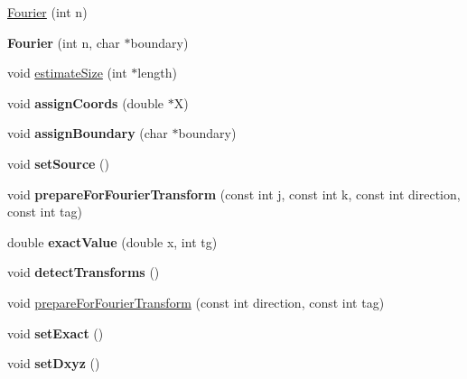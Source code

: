 \begin{DoxyCompactItemize}
\item 
\hyperlink{classFourier_a56003ca961eb3bd1caec48eb320903a7}{Fourier} (int n)
\item 
\hypertarget{classFourier_aeb302d1f719a360cf1a08a03511babcf}{{\bfseries Fourier} (int n, char $\ast$boundary)}\label{classFourier_aeb302d1f719a360cf1a08a03511babcf}

\item 
void \hyperlink{classFourier_a9dc1752ffd8a1f99c109f003308d6f8a}{estimate\-Size} (int $\ast$length)
\item 
\hypertarget{classFourier_a67b96468ace0838f1fe082e894785657}{void {\bfseries assign\-Coords} (double $\ast$X)}\label{classFourier_a67b96468ace0838f1fe082e894785657}

\item 
\hypertarget{classFourier_a844a3e6ffe6027a988cd232de72cf62d}{void {\bfseries assign\-Boundary} (char $\ast$boundary)}\label{classFourier_a844a3e6ffe6027a988cd232de72cf62d}

\item 
\hypertarget{classFourier_a1f74b27c03f745a385f7f6bd1f7a472a}{void {\bfseries set\-Source} ()}\label{classFourier_a1f74b27c03f745a385f7f6bd1f7a472a}

\item 
\hypertarget{classFourier_a2ee0ef96479ae0341dac74b8e009e23c}{void {\bfseries prepare\-For\-Fourier\-Transform} (const int j, const int k, const int direction, const int tag)}\label{classFourier_a2ee0ef96479ae0341dac74b8e009e23c}

\item 
\hypertarget{classFourier_a3de95ce38953778e883062600583dc54}{double {\bfseries exact\-Value} (double x, int tg)}\label{classFourier_a3de95ce38953778e883062600583dc54}

\item 
\hypertarget{classFourier_ad588616fc786bc591843673a21790d87}{void {\bfseries detect\-Transforms} ()}\label{classFourier_ad588616fc786bc591843673a21790d87}

\item 
void \hyperlink{classFourier_adad7350272b4e7b9a195851bc45d1e6a}{prepare\-For\-Fourier\-Transform} (const int direction, const int tag)
\item 
\hypertarget{classFourier_ab50bc164e1c34491f19ed9b6fa4387c5}{void {\bfseries set\-Exact} ()}\label{classFourier_ab50bc164e1c34491f19ed9b6fa4387c5}

\item 
\hypertarget{classFourier_a389f4684ba80d8611ee7f054e9a5b2c7}{void {\bfseries set\-Dxyz} ()}\label{classFourier_a389f4684ba80d8611ee7f054e9a5b2c7}


\end{DoxyCompactItemize}
